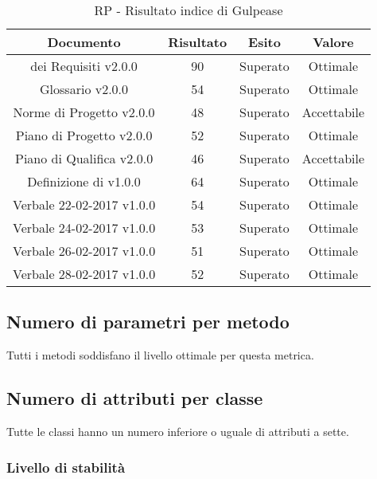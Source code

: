 \begin{table}[h]
	\begin{center}
		\begin{tabular}{|c|c|c|c|}
			\hline
			\textbf{Documento}	& \textbf{Risultato} & \textbf{Esito} & \textbf{Valore}\\
			\hline
		 \termine{Analisi} dei Requisiti v2.0.0 &	90 & Superato & Ottimale\\
			\hline
			Glossario v2.0.0 &	54 & Superato & Ottimale\\
			\hline
			Norme di Progetto v2.0.0 &	48 & Superato & Accettabile\\
			\hline
			Piano di Progetto v2.0.0	&	52 & Superato & Ottimale\\
			\hline
			Piano di Qualifica v2.0.0	&	46 & Superato & Accettabile\\
			\hline
			Definizione di \termine{Prodotto} v1.0.0	&	64 & Superato & Ottimale\\
			\hline
			Verbale 22-02-2017 v1.0.0	&	54 & Superato & Ottimale\\
			\hline
			Verbale 24-02-2017 v1.0.0	&	53 & Superato & Ottimale\\
			\hline
			Verbale 26-02-2017 v1.0.0	&	51 & Superato & Ottimale\\
			\hline
						Verbale 28-02-2017 v1.0.0	&	52 & Superato & Ottimale\\
			\hline
		\end{tabular}
	\end{center}
	\caption{RP - Risultato indice di Gulpease}
\end{table}

\subsection{Numero di parametri per metodo}

Tutti i metodi soddisfano il livello ottimale per questa metrica.

\subsection{Numero di attributi per classe}

Tutte le classi hanno un numero inferiore o uguale di attributi a sette.

\subsubsection{Livello di stabilità}

